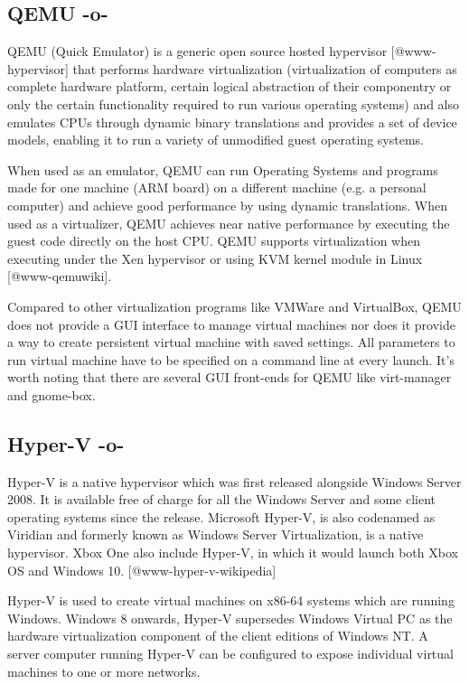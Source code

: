 \subsection{QEMU -o-}
     
QEMU (Quick Emulator) is a generic open source hosted
hypervisor [@www-hypervisor] that performs hardware virtualization
(virtualization of computers as complete hardware platform, certain
logical abstraction of their componentry or only the certain
functionality required to run various operating systems)
\cite{www-qemu} and also emulates CPUs through dynamic binary
translations and provides a set of device models, enabling it to run a
variety of unmodified guest operating systems.
     
When used as an emulator, QEMU can run Operating Systems and programs
made for one machine (ARM board) on a different machine (e.g. a
personal computer) and achieve good performance by using dynamic
translations.  When used as a virtualizer, QEMU achieves near native
performance by executing the guest code directly on the host CPU. QEMU
supports virtualization when executing under the Xen hypervisor or
using KVM kernel module in Linux [@www-qemuwiki].

Compared to other virtualization programs like VMWare and VirtualBox,
QEMU does not provide a GUI interface to manage virtual machines nor
does it provide a way to create persistent virtual machine with saved
settings. All parameters to run virtual machine have to be specified
on a command line at every launch. It's worth noting that there are
several GUI front-ends for QEMU like virt-manager and gnome-box.



\subsection{Hyper-V -o-}
     
Hyper-V is a native hypervisor which was first released alongside
Windows Server 2008. It is available free of charge for all the
Windows Server and some client operating systems since the
release. Microsoft Hyper-V, is also codenamed as Viridian and formerly
known as Windows Server Virtualization, is a native hypervisor. Xbox
One also include Hyper-V, in which it would launch both Xbox OS and
Windows 10. [@www-hyper-v-wikipedia]

Hyper-V is used to create virtual machines on x86-64 systems which are
running Windows. Windows 8 onwards, Hyper-V supersedes Windows Virtual
PC as the hardware virtualization component of the client editions of
Windows NT. A server computer running Hyper-V can be configured to
expose individual virtual machines to one or more networks.

